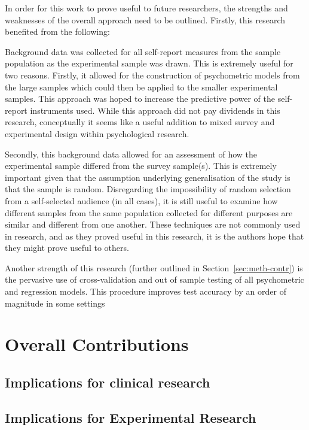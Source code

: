 In order for this work to prove useful to future researchers, the strengths and weaknesses of the overall approach need to be outlined. Firstly, this research benefited from the following:


Background data was collected for all self-report measures from the sample population as the experimental sample was drawn. This is extremely useful for two reasons. Firstly, it allowed for the construction of psychometric models from the large samples which could then be applied to the smaller experimental samples. This approach was hoped to increase the predictive power of the self-report instruments used. While this approach did not pay dividends in this research, conceptually it seems like a useful addition to mixed survey and experimental design within psychological research. 

Secondly, this background data allowed for an assessment of how the experimental sample differed from the survey sample(s). This is extremely important given that the assumption underlying generalisation of the study is that the sample is random. Disregarding the impossibility of random selection from a self-selected audience (in all cases), it is still useful to examine how different samples from the same population collected for different purposes are similar and different from one another. These techniques are not commonly used in research, and as they proved useful in this research, it is the authors hope that they might prove useful to others. 

Another strength of this research (further outlined in Section~\ref{sec:meth-contr}) is the pervasive use of cross-validation and out of sample testing of all psychometric and regression models. This procedure improves test accuracy by an order of magnitude in some settings 


\section{Overall Contributions}
\label{sec:over-contr}

\subsection{Implications for clinical research}
\label{sec:impl-clin-rese}

\subsection{Implications for Experimental Research}
\label{sec:impl-exper-rese}




